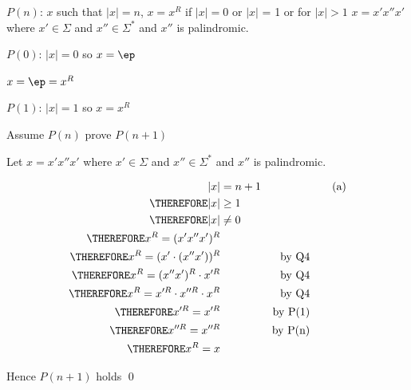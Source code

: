 $P(n)$: $x$ such that $|x| = n$, $x = x^R$ if $|x| = 0$ or $|x|$ = 1 or for $|x| > 1$ $x = x'x''x'$  where $x' \in \Sigma$
and $x'' \in \Sigma^*$ and $x''$ is palindromic.

$P(0)$: $|x| = 0$ so $x = \ep$

$x = \ep = x^R$

$P(1)$: $|x| = 1$ so $x = x^R$

Assume $P(n)$ prove $P(n+1)$

Let $x = x'x''x'$
where $x' \in \Sigma$
and $x'' \in \Sigma^*$ and $x''$ is palindromic.

\begin{align*}
  |x| &= n + 1                                                             & & \tag{a} \\ 
\THEREFORE |x| &\geq 1 \\
\THEREFORE |x| &\neq 0 \\
\THEREFORE x^R = (x'x''x')^R                                              \\
\THEREFORE x^R = (x'\cdot(x''x'))^R                                        & & \text{by Q4} \\
\THEREFORE x^R = (x''x')^R \cdot x'^R                                      & & \text{by Q4} \\
\THEREFORE x^R = x'^R \cdot x''^R \cdot x^R                                & & \text{by Q4} \\
\THEREFORE x'^R = x'^R                                          & & \text{by P(1)} \\
\THEREFORE x''^R = x''^R                                          & & \text{by P(n)} \\
\THEREFORE x^R = x
\end{align*}

Hence $P(n+1)$ holds
\qed
